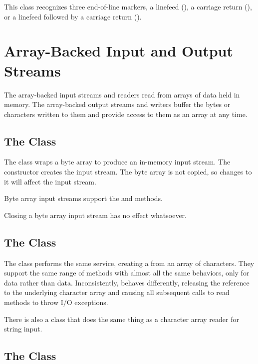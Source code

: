 This class recognizes three end-of-line markers,
a linefeed (), a carriage return (),
or a linefeed followed by a carriage return ().


\section{Array-Backed Input and Output Streams}

The array-backed input streams and readers read from arrays of data
held in memory.  The array-backed output streams and writers buffer
the bytes or characters written to them and provide access to them as
an array at any time.

\subsection{The  Class}

The class  wraps a byte array to produce an
in-memory input stream.  The constructor
 creates the input stream.  The
byte array is not copied, so changes to it will affect the input
stream.  

Byte array input streams support the  and 
methods.

Closing a byte array input stream has no effect whatsoever.

\subsection{The  Class}

The class  performs the same service, creating a
 from an array of characters.  They support the same
range of methods with almost all the same behaviors, only for
 data rather than  data.  Inconsistently,
 behaves differently, releasing the reference to the
underlying character array and causing all subsequent calls to read
methods to throw I/O exceptions.

There is also a class  that does the same thing
as a character array reader for string input.


\subsection{The  Class}

